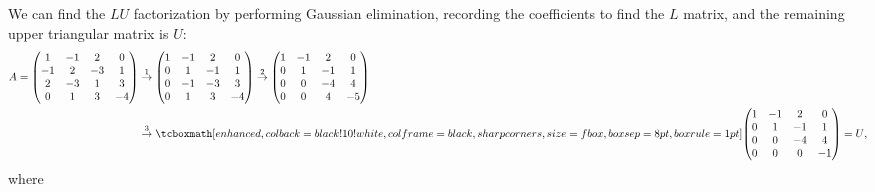 \def\duedate{10/27/22}
\def\HWnum{2}



    

We can find the $LU$ factorization by performing Gaussian elimination, recording the coefficients to find the $L$ matrix, and the remaining upper triangular matrix is $U$:
\begin{align}
    \label{eq:A-Gaussian}
    A = 
    \begin{pmatrix}
        1 & -1 & 2 & 0 \\
        -1 & 2 & -3 & 1 \\
        2 & -3 & 1 & 3 \\
        0 & 1 & 3 & -4
    \end{pmatrix}
    &\stackrel{1}{\rightarrow}
    \begin{pmatrix}
        1 & -1 & 2 & 0 \\
        0 & 1 & -1 & 1 \\
        0 & -1 & -3 & 3 \\
        0 & 1 & 3 & -4
    \end{pmatrix}
    \stackrel{2}{\rightarrow}
    \begin{pmatrix}
        1 & -1 & 2 & 0 \\
        0 & 1 & -1 & 1 \\
        0 & 0 & -4 & 4 \\
        0 & 0 & 4 & -5
    \end{pmatrix} \\
    &\stackrel{3}{\rightarrow}
    \eqbox{
    \begin{pmatrix}
        1 & -1 & 2 & 0 \\
        0 & 1 & -1 & 1 \\
        0 & 0 & -4 & 4 \\
        0 & 0 & 0 & -1
    \end{pmatrix} 
    = U}
,\end{align}
where

